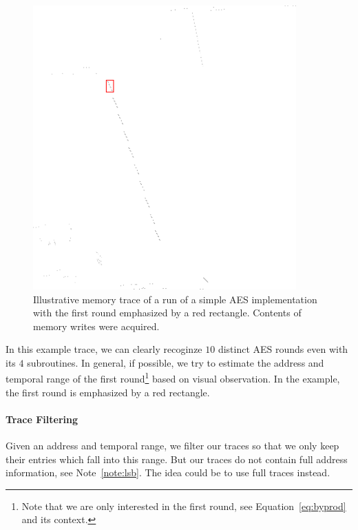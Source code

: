		\begin{figure}[h!]
		\begin{center}
			\includegraphics[width=0.9\textwidth]{./figures/memtrace/memtrace_emph.png}
			\caption{Illustrative memory trace of a run of a simple AES implementation with the first round emphasized by a red rectangle. Contents of memory writes were acquired.}
			\label{fig:memtrace}
		\end{center}
		\end{figure}
		
		In this example trace, we can clearly recoginze $10$ distinct AES rounds even with its $4$ subroutines. In general, if possible, we try to estimate the address and temporal range of the first round\footnote{Note that we are only interested in the first round, see Equation~\ref{eq:byprod} and its context.} based on visual observation. In the example, the first round is emphasized by a red rectangle.

	\paragraph{Trace Filtering}
		
		Given an address and temporal range, we filter our traces so that we only keep their entries which fall into this range. But our traces do not contain full address information, see Note~\ref{note:lsb}. The idea could be to use full traces instead.
		
